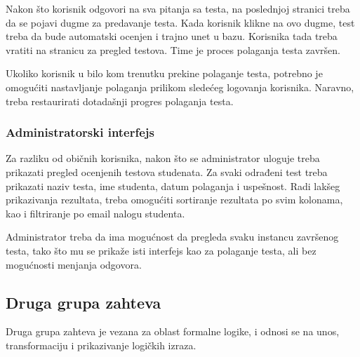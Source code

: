 Nakon što korisnik odgovori na sva pitanja sa testa, na poslednjoj stranici treba da se pojavi dugme za predavanje testa. Kada korisnik klikne na ovo dugme, test treba da bude automatski ocenjen i trajno unet u bazu. Korisnika tada treba vratiti na stranicu za pregled testova. Time je proces polaganja testa završen.

Ukoliko korisnik u bilo kom trenutku prekine polaganje testa, potrebno je omogućiti nastavljanje polaganja prilikom sledećeg logovanja korisnika. Naravno, treba restaurirati dotadašnji progres polaganja testa.

\subsubsection{Administratorski interfejs}
Za razliku od običnih korisnika, nakon što se administrator uloguje treba prikazati pregled ocenjenih testova studenata. Za svaki odrađeni test treba prikazati naziv testa, ime studenta, datum polaganja i uspešnost. Radi lakšeg prikazivanja rezultata, treba omogućiti sortiranje rezultata po svim kolonama, kao i filtriranje po email nalogu studenta.

Administrator treba da ima mogućnost da pregleda svaku instancu završenog testa, tako što mu se prikaže isti interfejs kao za polaganje testa, ali bez mogućnosti menjanja odgovora.

\subsection{Druga grupa zahteva}
Druga grupa zahteva je vezana za oblast formalne logike, i odnosi se na unos, transformaciju i prikazivanje logičkih izraza.

